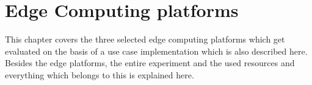 \chapter{Edge Computing platforms}
This chapter covers the three selected edge computing platforms which get evaluated on the basis of a use case implementation which is also described here. Besides the edge platforms, the entire experiment and the used resources and everything which belongs to this is explained here.



\newpage


